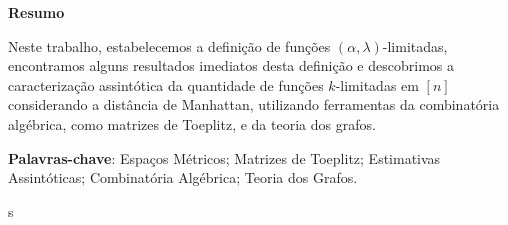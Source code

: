\begin{center}
  \large \textbf{Resumo}
\end{center}
\vspace{1cm}
\par Neste trabalho, estabelecemos a definição de funções $(\alpha, \lambda)$-limitadas, encontramos alguns resultados imediatos desta definição e descobrimos a caracterização assintótica da quantidade de funções $k$-limitadas em $[n]$ considerando a distância de Manhattan, utilizando ferramentas da combinatória algébrica, como matrizes de Toeplitz, e da teoria dos grafos.

\vspace{1cm}

\begin{raggedleft}
  \textbf{Palavras-chave}: Espaços Métricos; Matrizes de Toeplitz; Estimativas Assintóticas; Combinatória Algébrica; Teoria dos Grafos.
\end{raggedleft}
\newpage
s